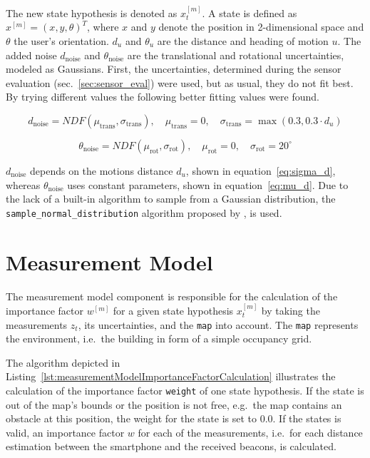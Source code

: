 \noindent The new state hypothesis is denoted as $x^{[m]}_t$. A state is defined as $x^{[m]} = (x, y, \theta)^T$, where $x$ and $y$ denote the position in 2-dimensional space and $\theta$ the user's orientation. $d_u$ and $\theta_u$ are the distance and heading of motion $u$. The added noise $d_\text{noise}$ and $\theta_\text{noise}$ are the translational and rotational uncertainties, modeled as Gaussians. First, the uncertainties, determined during the sensor evaluation (sec.~\ref{sec:sensor_eval}) were used, but as usual, they do not fit best. By trying different values the following better fitting values were found.

\begin{equation}\label{eq:sigma_d}
	d_\text{noise} = NDF(\mu_\text{trans}, \sigma_\text{trans}) ,
	\quad \mu_\text{trans} = 0 ,
	 \quad \sigma_{\text{trans}} = \max(0.3, 0.3 \cdot d_u)
\end{equation}

\begin{equation}\label{eq:mu_d}
	\theta_\text{noise} = NDF(\mu_\text{rot}, \sigma_\text{rot}), \quad
	\mu_\text{rot} = 0 , \quad
	\sigma_\text{rot} = 20^{\circ}
\end{equation}

\noindent $d_\text{noise}$ depends on the motions distance $d_u$, shown in equation~\ref{eq:sigma_d}, whereas $\theta_\text{noise}$ uses constant parameters, shown in equation~\ref{eq:mu_d}. Due to the lack of a built-in algorithm to sample from a Gaussian distribution, the \texttt{sample\_normal\_distribution} algorithm proposed by \citet[p.~124]{thrun:prob_robo}, is used.


\section{Measurement Model}\label{sec:algo_measurement_model}
The measurement model component is responsible for the calculation of the importance factor $w^{[m]}$ for a given state hypothesis $x^{[m]}_t$ by taking the measurements $z_t$, its uncertainties, and the \texttt{map} into account. The \texttt{map} represents the environment, i.e.\ the building in form of a simple occupancy grid.

The algorithm depicted in Listing~\ref{lst:measurementModelImportanceFactorCalculation} illustrates the calculation of the importance factor \texttt{weight} of one state hypothesis. If the state is out of the map's bounds or the position is not free, e.g.\ the map contains an obstacle at this position, the weight for the state is set to 0.0. If the states is valid, an importance factor $w$ for each of the measurements, i.e.\ for each distance estimation between the smartphone and the received beacons, is calculated.

